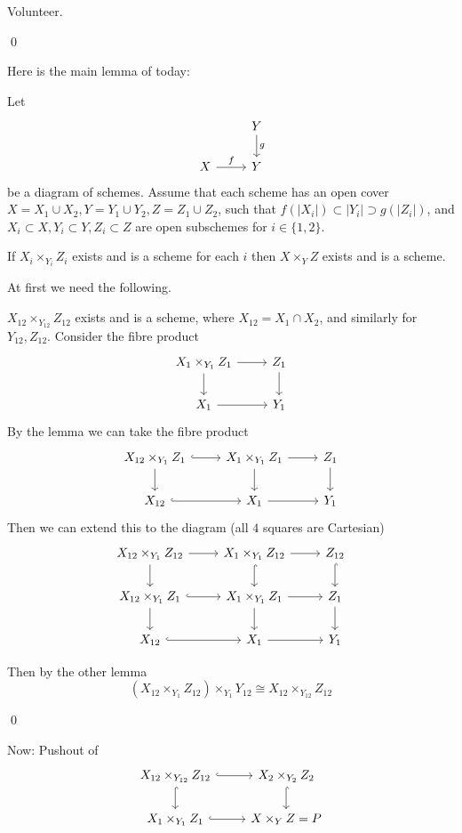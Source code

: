 \documentclass[x11names,reqno,14pt]{extarticle}
\begin{document}
\proof

Volunteer. 

\qed

Here is the main lemma of today:

\lem

Let
\[
\begin{tikzcd}
& Y \ar[d, "g"] \\
X \ar[r, "f"] & Y
\end{tikzcd}
\]
be a diagram of schemes. Assume that each scheme has an open cover $X = X_1 \cup X_2, Y = Y_1\cup Y_2, Z = Z_1 \cup Z_2$, such that $f(|X_i|) \subset |Y_i| \supset g(|Z_i|)$, and $X_i \subset X, Y_i \subset Y, Z_i \subset Z$ are open subschemes for $i \in \{1,2\}$. 

If $X_i\times_{Y_i}Z_i$ exists and is a scheme for each $i$ then $X\times_YZ$ exists and is a scheme. 

\proof

At first we need the following.

\claim

$X_{12}\times_{Y_{12}}Z_{12}$ exists and is a scheme, where $X_{12} = X_1\cap X_2$, and similarly for $Y_{12},Z_{12}$. 
\proof
Consider the fibre product
\[
\begin{tikzcd}
X_1\times_{Y_1}Z_1 \ar[d]\ar[r] & Z_1\ar[d] \\
X_1 \ar[r] & Y_1
\end{tikzcd}
\]
By the lemma we can take the fibre product 
\[
\begin{tikzcd}
\ar[d]X_{12}\times_{Y_1}Z_1 \ar[r, hook] & X_1\times_{Y_1}Z_1 \ar[d]\ar[r] & Z_1\ar[d] \\
X_{12} \ar[r, hook] & X_1 \ar[r] & Y_1
\end{tikzcd}
\]
Then we can extend this to the diagram (all $4$ squares are Cartesian)
\[
\begin{tikzcd}
X_{12}\times_{Y_1}Z_{12} \ar[d] \ar[r] & X_1\times_{Y_1}Z_{12} \ar[d, hook] \ar[r] & Z_{12} \ar[d, hook] \\
\ar[d]X_{12}\times_{Y_1}Z_1 \ar[r, hook] & X_1\times_{Y_1}Z_1 \ar[d]\ar[r] & Z_1\ar[d] \\
X_{12} \ar[r, hook] & X_1 \ar[r] & Y_1
\end{tikzcd}
\]

Then by the other lemma
\[
(X_{12}\times_{Y_{1}}Z_{12}) \times_{Y_1}Y_{12} \cong X_{12}\times_{Y_{12}}Z_{12}
\]

\qed

Now: Pushout of 
\[
\begin{tikzcd}
X_{12}\times_{Y_{12}}Z_{12} \ar[r, hook] \ar[d, hook] & X_2\times_{Y_2}Z_2\ar[d, hook] \\
X_1\times_{Y_1}Z_1 \ar[r, hook] & X\times_YZ = P
\end{tikzcd}
\]
\claim
\end{document}
